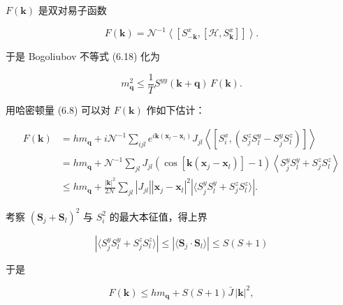 $F(\mathbf{k})$ 是双对易子函数

\begin{equation*}
F ( \mathbf {k} ) = \mathcal {N} ^ {- 1} \left\langle \left[ S _ {- \mathbf {k}} ^ {x}, [ \mathcal {H}, S _ {\mathbf {k}} ^ {x} ] \right] \right\rangle .
\tag{6.22}
\end{equation*}

于是 Bogoliubov 不等式 (6.18) 化为

\begin{equation*}
m _ {\mathbf {q}} ^ {2} \leq \frac {1}{T} S ^ {yy} ( \mathbf {k} + \mathbf {q} ) \, F ( \mathbf {k} ).
\tag{6.23}
\end{equation*}

用哈密顿量 (6.8) 可以对 $F(\mathbf{k})$ 作如下估计：

\begin{align*}
F ( \mathbf {k} ) & = h m _ {\mathbf {q}} + i \mathcal {N} ^ {- 1} \sum_ {ijl} e ^ {i \mathbf {k} ( \mathbf {x} _ {l} - \mathbf {x} _ {i} )} J _ {jl} \left\langle \left[ S _ {i} ^ {x}, \left( S _ {j} ^ {z} S _ {l} ^ {y} - S _ {j} ^ {y} S _ {l} ^ {z} \right) \right] \right\rangle\\
& = h m _ {\mathbf {q}} + \mathcal {N} ^ {- 1} \sum_ {jl} J _ {jl} \left( \cos [ \mathbf {k} ( \mathbf {x} _ {j} - \mathbf {x} _ {l} ) ] - 1 \right) \left\langle S _ {j} ^ {y} S _ {l} ^ {y} + S _ {j} ^ {z} S _ {l} ^ {z} \right\rangle\\
& \leq h m _ {\mathbf {q}} + \frac {| \mathbf {k} | ^ {2}}{2 \mathcal {N}} \sum_ {jl} \left| J _ {jl} \right| \left| \mathbf {x} _ {j} - \mathbf {x} _ {l} \right| ^ {2} \left| \langle S _ {j} ^ {y} S _ {l} ^ {y} + S _ {j} ^ {z} S _ {l} ^ {z} \rangle \right| .
\tag{6.24}
\end{align*}

考察 $(\mathbf{S}_{j} + \mathbf{S}_{l})^{2}$ 与 $S_{i}^{2}$ 的最大本征值，得上界

\begin{equation*}
\left| \langle S _ {j} ^ {y} S _ {l} ^ {y} + S _ {j} ^ {z} S _ {l} ^ {z} \rangle \right| \leq \left| \langle \mathbf {S} _ {j} \cdot \mathbf {S} _ {l} \rangle \right| \leq S ( S + 1 )
\tag{6.25}
\end{equation*}

于是

\begin{equation*}
F ( \mathbf {k} ) \leq h m _ {\mathbf {q}} + S ( S + 1 ) \bar {J} \, | \mathbf {k} | ^ {2} ,
\tag{6.26}
\end{equation*}

